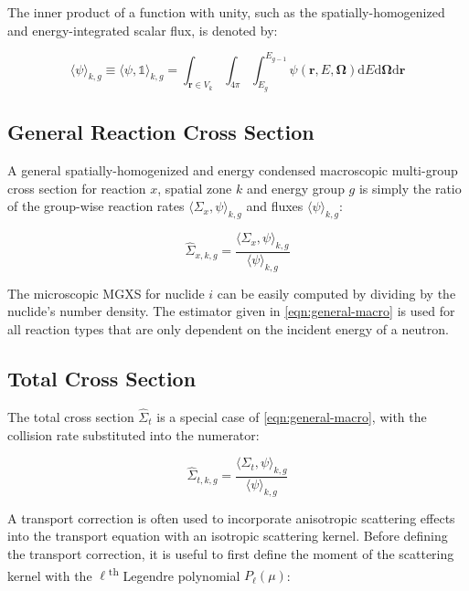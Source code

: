 \noindent The inner product of a function with unity, such as the spatially-homogenized and energy-integrated scalar flux, is denoted by:

\begin{equation}
\label{eqn:angle-flux}
\langle \psi \rangle_{k,g} \equiv \langle \psi, \mathbb{1} \rangle_{k,g} = \int_{\mathbf{r} \in V_{k}} \int_{4\pi} \int_{E_{g}}^{E_{g-1}} \psi(\mathbf{r},E,\mathbf{\Omega}) \mathrm{d}E\mathrm{d}\mathbf{\Omega}\mathrm{d}\mathbf{r}
\end{equation}

\subsection{General Reaction Cross Section}
\label{subsubsec:tally-types-gen-xs}

A general spatially-homogenized and energy condensed macroscopic multi-group cross section for reaction $x$, spatial zone $k$ and energy group $g$ is simply the ratio of the group-wise reaction rates $\langle \Sigma_{x}, \psi \rangle_{k,g}$ and fluxes $\langle \psi \rangle_{k,g}$:

\begin{equation}
\label{eqn:general-macro}
\hat{\Sigma}_{x,k,g} = \frac{\langle \Sigma_{x}, \psi \rangle_{k,g}}{\langle \psi \rangle_{k,g}}
\end{equation}

\noindent The microscopic MGXS for nuclide $i$ can be easily computed by dividing by the nuclide's number density. The estimator given in \cref{eqn:general-macro} is used for all reaction types that are only dependent on the incident energy of a neutron.

\subsection{Total Cross Section}
\label{subsubsec:tally-types-tot-xs}

The total cross section $\hat{\Sigma}_{t}$ is a special case of \cref{eqn:general-macro}, with the collision rate substituted into the numerator:

\begin{equation}
\label{eqn:total-macro}
\hat{\Sigma}_{t,k,g} = \frac{\langle \Sigma_{t}, \psi \rangle_{k,g}}{\langle \psi \rangle_{k,g}}
\end{equation}

A transport correction is often used to incorporate anisotropic scattering effects into the transport equation with an isotropic scattering kernel. Before defining the transport correction, it is useful to first define the moment of the scattering kernel with the $\ell$\textsuperscript{th} Legendre polynomial $P_{\ell}(\mu)$:

